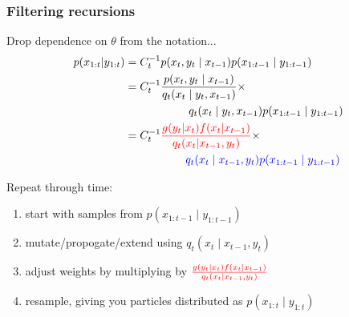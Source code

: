 \documentclass{beamer}
\begin{document}
\begin{frame}[fragile]
\frametitle{Filtering recursions}

Drop dependence on $\theta$ from the notation...
\begin{align*}
p(x_{1:t}|y_{1:t}) &=C_{t}^{-1} p(x_{t} , y_t  \mid x_{t-1})p(x_{1:t-1} \mid y_{1:t-1}) \\
&= C_{t}^{-1} \frac{p(x_t, y_t \mid x_{t-1})}{q_{t}(x_{t} \mid y_{t},x_{t-1})} \times \\
& \hspace{20mm} q_{t}(x_{t} \mid y_{t},x_{t-1})p(x_{1:t-1} \mid y_{1:t-1}) \\
&= C_{t}^{-1} \begingroup\color{red} \frac{g(y_t|x_t)f(x_t|x_{t-1})}{q_t(x_t|x_{t-1},y_t) } \endgroup \times \\
& \hspace{19mm} \begingroup\color{blue} q_t(x_t \mid x_{t-1},y_t) p(x_{1:t-1} \mid y_{1:t-1}) \endgroup\\
\end{align*}

Repeat through time:
\begin{enumerate}
\item start with samples from $p(x_{1:t-1} \mid y_{1:t-1})$
\item mutate/propogate/extend using $q_t(x_t \mid x_{t-1},y_t)$
\item adjust weights by multiplying by $ \begingroup\color{red} \frac{g(y_t|x_t)f(x_t|x_{t-1})}{q_t(x_t|x_{t-1},y_t) } \endgroup $
\item resample, giving you particles distributed as $p(x_{1:t} \mid y_{1:t})$
\end{enumerate}


\end{frame}



\begin{frame}
\printbibliography
\end{frame}
\end{document}
